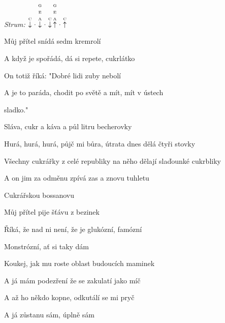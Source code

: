 \begin{song}


\begin{strumbox}
\textit{Strum:} $\PluckDown{C}\Miss\PluckDown{G \\ E \\ A}\Miss\PluckDown{C}\PluckUp{G \\ E \\ A}\Miss\PluckUp{C}$
\end{strumbox}

\begin{hchordbox}
\end{hchordbox}

\bigskip

Můj přítel  snídá sedm kremrolí  \par
A když je spořádá, dá si repete, cukrlátko  \par
On totiž říká:  "Dobré lidi zuby nebolí  \par
A je to paráda, chodit po světě a mít, mít v ústech \par
{}sladko."    \par

\bigskip

\begin{chorusboxwide}{\Refren}
Sláva,  cukr a káva a půl litru becherovky \par
{}Hurá, hurá, hurá, půjč mi bůra, útrata dnes dělá čtyři stovky \par
Všechny cukrářky z celé  republiky na něho dělají slaďounké cukrbliky \par
A on jim za odměnu zpívá zas a znovu tuhletu  \par
Cukrářskou bossanovu    \par
\end{chorusboxwide}

\bigskip

Můj přítel  pije šťávu z bezinek  \par
Říká, že nad ni není, že je glukózní, famózní \par
{}Monstrózní, ať si taky dám \par
Koukej, jak mu roste  oblast budoucích maminek  \par
A já mám podezření že se zakulatí jako míč \par
A až ho někdo kopne, odkutálí se mi pryč \par
A já zůstanu sám,  úplně sám  \par


\end{song}
